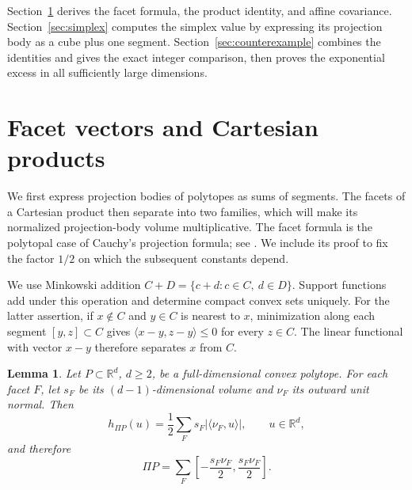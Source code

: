 \documentclass[11pt]{article}
\newtheorem{lemma}[theorem]{Lemma}
\newcommand{\R}{\mathbb R}
\begin{document}
Section~\ref{sec:facets} derives the facet formula, the product identity,
and affine covariance. Section~\ref{sec:simplex} computes the simplex
value by expressing its projection body as a cube plus one segment.
Section~\ref{sec:counterexample} combines the identities and gives the
exact integer comparison, then proves the exponential excess in all
sufficiently large dimensions.

\section{Facet vectors and Cartesian products}\label{sec:facets}

We first express projection bodies of polytopes as sums of segments.
The facets of a Cartesian product then separate into two families,
which will make its normalized projection-body volume multiplicative.
The facet formula is the polytopal case of Cauchy's projection formula;
see \cite[Section~1]{Saroglou}. We include its proof
to fix the factor \(1/2\) on which the subsequent constants depend.

We use Minkowski addition \(C+D=\{c+d:c\in C,\ d\in D\}\).
Support functions add under this operation and determine compact convex
sets uniquely. For the latter assertion, if \(x\notin C\) and \(y\in C\)
is nearest to \(x\), minimization along each segment \([y,z]\subset C\)
gives \(\langle x-y,z-y\rangle\le0\) for every \(z\in C\). The linear
functional with vector \(x-y\) therefore separates \(x\) from \(C\).

\begin{samepage}
\begin{lemma}\label{lem:facets}
Let \(P\subset\R^d\), \(d\ge2\), be a full-dimensional convex polytope. For each facet
\(F\), let \(s_F\) be its \((d-1)\)-dimensional volume and \(\nu_F\) its
outward unit normal. Then
\begin{equation}\label{eq:facet}
 h_{\Pi P}(u)=\frac12\sum_Fs_F|\langle\nu_F,u\rangle|,
 \qquad u\in\R^d,
\end{equation}
and therefore
\begin{equation}\label{eq:zonotope}
 \Pi P=\sum_F
 \left[-\frac{s_F\nu_F}{2},\frac{s_F\nu_F}{2}\right].
\end{equation}
\end{lemma}
\end{samepage}
\end{document}
